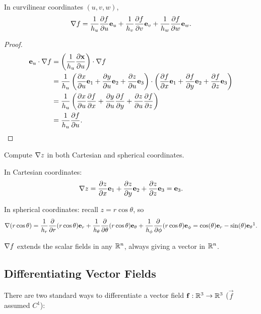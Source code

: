 \documentclass[10pt, a4paper]{article}
\begin{document}
\begin{proposition}
    In curvilinear coordinates $(u, v, w)$,
    \[
    \bnabla f = \frac{1}{h_u}\pd[f]{u}\vec{e}_u + \frac{1}{h_v}\pd[f]{v}\vec{e}_v + \frac{1}{h_w}\pd[f]{w}\vec{e}_w.
    \]

    \begin{proof}
        \begin{align*}
            \vec{e}_u \cdot \bnabla f &= \left(\frac{1}{h_u}\pd[\vec{x}]{u}\right)\cdot\bnabla f \\
            &= \frac{1}{h_u}\left(\pd[x]{u}\vec{e}_1 + \pd[y]{u}\vec{e}_2 + \pd[z]{u}\vec{e}_3\right)\cdot\left(\pd[f]{x}\vec{e}_1 + \pd[f]{y}\vec{e}_2 + \pd[f]{z}\vec{e}_3\right) \\
            &= \frac{1}{h_u}\left(\pd[x]{u}\pd[f]{x} + \pd[y]{u}\pd[f]{y} + \pd[z]{u}\pd[f]{z}\right) \\
            &= \frac{1}{h_u}\pd[f]{u}.
        \end{align*}
    \end{proof}
\end{proposition}

\begin{example}
    Compute $\bnabla z$ in both Cartesian and spherical coordinates.

    \begin{solution}
        In Cartesian coordinates:
        \[
        \bnabla z = \pd[z]{x}\vec{e}_1 + \pd[z]{y}\vec{e}_2 + \pd[z]{z}\vec{e}_3 = \vec{e}_3.
        \]

        In spherical coordinates:
        recall $z = r\cos{\theta}$,
        so
        \[
        \bnabla(r\cos{\theta}) = \frac{1}{h_r}\pd{r}(r\cos{\theta})\vec{e}_r + \frac{1}{h_{\theta}}\pd{\theta}(r\cos{\theta})\vec{e}_{\theta} + \frac{1}{h_{\phi}}\pd{\phi}(r\cos{\theta})\vec{e}_{\phi} = \cos(\theta)\vec{e}_r - \sin(\theta)\vec{e}_{\theta}\footnotemark.
        \]
    \end{solution}
\end{example}

\begin{remark}
    $\bnabla f$ extends the scalar fields in any $\R ^ n$,
    always giving a vector in $\R ^ n$.
\end{remark}

\subsection{Differentiating Vector Fields}
There are two standard ways to differentiate a vector field $\vec{f} : \R ^ 3 \to \R ^ 3$
($\vec{f}$ assumed $C ^ {1}$):
\end{document}
